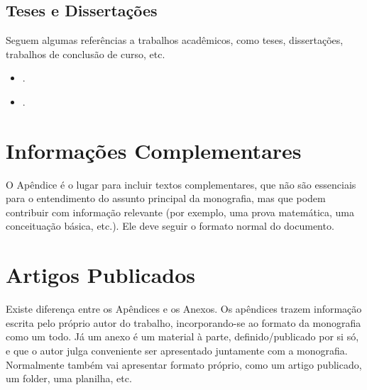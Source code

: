 \documentclass[twoside,english,brazilian]{UNISINOSmonografia}
\begin{document}
\section{Teses e Dissertações}
Seguem algumas referências a trabalhos acadêmicos, como teses, dissertações, trabalhos de conclusão de curso, etc.
\begin{itemize}
	\item {}.
	\item {}.
\end{itemize}



\appendix
\chapter{Informações Complementares}

O Apêndice é o lugar para incluir textos complementares, que não são essenciais para o entendimento do assunto principal da monografia, mas que podem contribuir com informação relevante (por exemplo, uma prova matemática, uma conceituação básica, etc.).  Ele deve seguir o formato normal do documento.

\annex
\chapter{Artigos Publicados}
Existe diferença entre os Apêndices e os Anexos.  Os apêndices trazem informação escrita pelo próprio autor do trabalho, incorporando-se ao formato da monografia como um todo.  Já um anexo é um material à parte, definido/publicado por si só, e que o autor julga conveniente ser apresentado juntamente com a monografia.  Normalmente também vai apresentar formato próprio, como um artigo publicado, um folder, uma planilha, etc.
\end{document}
